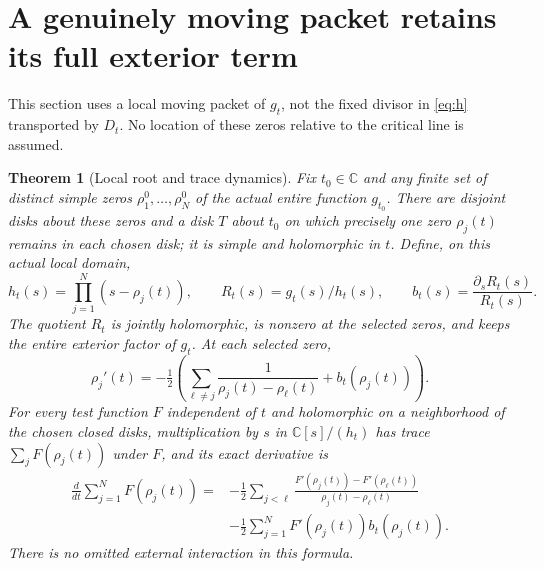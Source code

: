 \documentclass[11pt]{article}
\newcommand{\C}{\mathbb C}\newcommand{\R}{\mathbb R}
\newtheorem{theorem}{Theorem}[section]
\begin{document}


\section{A genuinely moving packet retains its full exterior term}

This section uses a local moving packet of $g_t$, not the fixed
divisor in \eqref{eq:h} transported by $D_t$. No location of these
zeros relative to the critical line is assumed.

\begin{theorem}[Local root and trace dynamics]\label{thm:moving}
Fix $t_0\in\C$ and any finite set of distinct simple zeros
$\rho_1^0,\ldots,\rho_N^0$ of the actual entire function $g_{t_0}$.
There are disjoint disks about these zeros and a disk $T$ about
$t_0$ on which precisely one zero $\rho_j(t)$ remains in each
chosen disk; it is simple and holomorphic in $t$.
Define, on this actual local domain,
\begin{equation}\label{eq:moving-factor}
h_t(s)=\prod_{j=1}^N(s-\rho_j(t)),\qquad
R_t(s)=g_t(s)/h_t(s),\qquad b_t(s)=\frac{\partial_sR_t(s)}{R_t(s)}.
\end{equation}
The quotient $R_t$ is jointly holomorphic, is nonzero at the
selected zeros, and keeps the entire exterior factor of $g_t$.
At each selected zero,
\begin{equation}\label{eq:velocity}
\rho_j'(t)=-\tfrac12\left(
\sum_{\ell\ne j}\frac1{\rho_j(t)-\rho_\ell(t)}
+b_t(\rho_j(t))\right).
\end{equation}
For every test function $F$ independent of $t$ and holomorphic on
a neighborhood of the chosen closed disks, multiplication
by $s$ in $\C[s]/(h_t)$ has trace $\sum_jF(\rho_j(t))$ under $F$,
and its exact derivative is
\begin{equation}\label{eq:moving-trace}
\begin{split}
\frac d{dt}\sum_{j=1}^NF(\rho_j(t))
={}&-\frac12\sum_{j<\ell}
\frac{F'(\rho_j(t))-F'(\rho_\ell(t))}
{\rho_j(t)-\rho_\ell(t)}\\
&-\frac12\sum_{j=1}^NF'(\rho_j(t))b_t(\rho_j(t)).
\end{split}
\end{equation}
There is no omitted external interaction in this formula.
\end{theorem}
\end{document}
